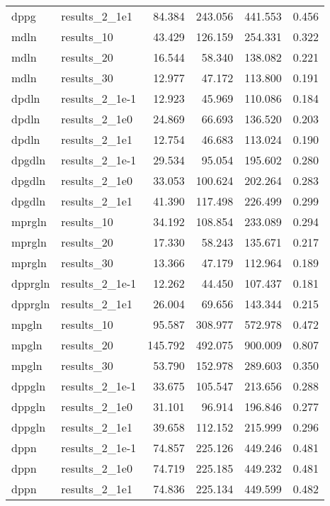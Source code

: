 \begin{table}[ht]
\begin{tabular}{llrrrr}
  dppg & results\_2\_1e1 & 84.384 & 243.056 & 441.553 & 0.456 \\ 
  mdln & results\_10 & 43.429 & 126.159 & 254.331 & 0.322 \\ 
  mdln & results\_20 & 16.544 & 58.340 & 138.082 & 0.221 \\ 
  mdln & results\_30 & 12.977 & 47.172 & 113.800 & 0.191 \\ 
  dpdln & results\_2\_1e-1 & 12.923 & 45.969 & 110.086 & 0.184 \\ 
  dpdln & results\_2\_1e0 & 24.869 & 66.693 & 136.520 & 0.203 \\ 
  dpdln & results\_2\_1e1 & 12.754 & 46.683 & 113.024 & 0.190 \\ 
  dpgdln & results\_2\_1e-1 & 29.534 & 95.054 & 195.602 & 0.280 \\ 
  dpgdln & results\_2\_1e0 & 33.053 & 100.624 & 202.264 & 0.283 \\ 
  dpgdln & results\_2\_1e1 & 41.390 & 117.498 & 226.499 & 0.299 \\ 
  mprgln & results\_10 & 34.192 & 108.854 & 233.089 & 0.294 \\ 
  mprgln & results\_20 & 17.330 & 58.243 & 135.671 & 0.217 \\ 
  mprgln & results\_30 & 13.366 & 47.179 & 112.964 & 0.189 \\ 
  dpprgln & results\_2\_1e-1 & 12.262 & 44.450 & 107.437 & 0.181 \\ 
  dpprgln & results\_2\_1e1 & 26.004 & 69.656 & 143.344 & 0.215 \\ 
  mpgln & results\_10 & 95.587 & 308.977 & 572.978 & 0.472 \\ 
  mpgln & results\_20 & 145.792 & 492.075 & 900.009 & 0.807 \\ 
  mpgln & results\_30 & 53.790 & 152.978 & 289.603 & 0.350 \\ 
  dppgln & results\_2\_1e-1 & 33.675 & 105.547 & 213.656 & 0.288 \\ 
  dppgln & results\_2\_1e0 & 31.101 & 96.914 & 196.846 & 0.277 \\ 
  dppgln & results\_2\_1e1 & 39.658 & 112.152 & 215.999 & 0.296 \\ 
  dppn & results\_2\_1e-1 & 74.857 & 225.126 & 449.246 & 0.481 \\ 
  dppn & results\_2\_1e0 & 74.719 & 225.185 & 449.232 & 0.481 \\ 
  dppn & results\_2\_1e1 & 74.836 & 225.134 & 449.599 & 0.482 \\ 
   \hline
\end{tabular}
\label{tab:dev}
\end{table}
